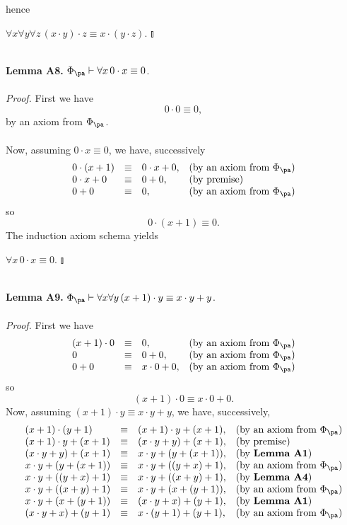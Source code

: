hence
\begin{center}
\phantom{$\talloblong$} \hfill $\forall x \forall y \forall z \, (x \cdot y) \cdot z \equiv x \cdot (y \cdot z).$ \hfill $\talloblong$
\end{center}
\ \\
\textbf{Lemma A8.} $\Phi_\pa \vdash \forall x \, 0 \cdot x \equiv 0$.\\
\ \\
\textit{Proof.} First we have
\[
0 \cdot 0 \equiv 0,
\]
by an axiom from $\Phi_\pa$.\\
\ \\
Now, assuming $0 \cdot x \equiv 0$, we have, successively
\[
\begin{array}{llll}
0 \cdot (x + 1) & \equiv & 0 \cdot x + 0, & \mbox{(by an axiom from $\Phi_\pa$)}\cr
0 \cdot x + 0 & \equiv & 0 + 0, & \mbox{(by premise)}\cr
0 + 0 & \equiv & 0, & \mbox{(by an axiom from $\Phi_\pa$)}
\end{array}
\]
so
\[
0 \cdot (x + 1) \equiv 0.
\]
The induction axiom schema yields
\begin{center}
\phantom{$\talloblong$} \hfill $\forall x \, 0 \cdot x \equiv 0.$ \hfill $\talloblong$
\end{center}
\ \\
\textbf{Lemma A9.} $\Phi_\pa \vdash \forall x \forall y \, (x + 1) \cdot y \equiv x \cdot y + y$.\\
\ \\
\textit{Proof.} First we have
\[
\begin{array}{llll}
(x + 1) \cdot 0 & \equiv & 0, & \mbox{(by an axiom from $\Phi_\pa$)}\cr
0 & \equiv & 0 + 0, & \mbox{(by an axiom from $\Phi_\pa$)}\cr
0 + 0 & \equiv & x \cdot 0 + 0, & \mbox{(by an axiom from $\Phi_\pa$)}
\end{array}
\]
so
\[
(x + 1) \cdot 0 \equiv x \cdot 0 + 0.
\]
Now, assuming $(x + 1) \cdot y \equiv x \cdot y + y$, we have, successively,
\[
\begin{array}{llll}
(x + 1) \cdot (y + 1) & \equiv & (x + 1) \cdot y + (x + 1), & \mbox{(by an axiom from $\Phi_\pa$)}\cr
(x + 1) \cdot y + (x + 1) & \equiv & (x \cdot y + y) + (x + 1), & \mbox{(by premise)}\cr
(x \cdot y + y) + (x + 1) & \equiv & x \cdot y + (y + (x + 1)), & \mbox{(by \textbf{Lemma A1})}\cr
x \cdot y + (y + (x + 1)) & \equiv & x \cdot y + ((y + x) + 1), & \mbox{(by an axiom from $\Phi_\pa$)}\cr
x \cdot y + ((y + x) + 1) & \equiv & x \cdot y + ((x + y) + 1), & \mbox{(by \textbf{Lemma A4})}\cr
x \cdot y + ((x + y) + 1) & \equiv & x \cdot y + (x + (y + 1)), & \mbox{(by an axiom from $\Phi_\pa$)}\cr
x \cdot y + (x + (y + 1)) & \equiv & (x \cdot y + x) + (y + 1), & \mbox{(by \textbf{Lemma A1})}\cr
(x \cdot y + x) + (y + 1) & \equiv & x \cdot (y + 1) + (y + 1), & \mbox{(by an axiom from $\Phi_\pa$)}
\end{array}
\]
